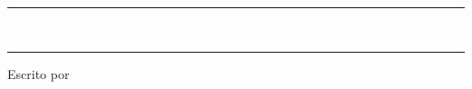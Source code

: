 %

\begin{titlepage}

    \centering

    \vspace*{\baselineskip}

    \rule{\textwidth}{1.6pt} %

    \vspace{0.75\baselineskip} %

    {\thetitle\\}

    \vspace{0.75\baselineskip} %

    \rule{\textwidth}{1.6pt} %

    \vspace{2\baselineskip}

    \thedescription

    \vspace*{3\baselineskip}

    Escrito por

    \vspace{0.5\baselineskip}

    {\Large \theauthor}

    \vspace{0.5\baselineskip}

    \textit{\theinstitution}

    \vfill %


    \vspace{0.3\baselineskip}

    {\large\thedate}

\end{titlepage}
